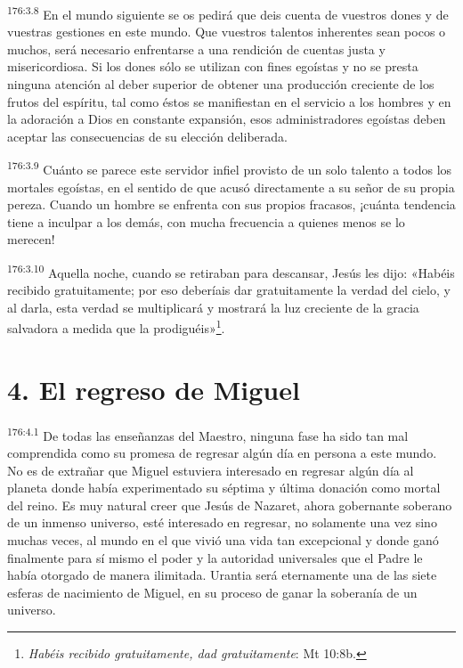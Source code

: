 \par 
\textsuperscript{176:3.8} En el mundo siguiente se os pedirá que deis cuenta de vuestros dones y de vuestras gestiones en este mundo. Que vuestros talentos inherentes sean pocos o muchos, será necesario enfrentarse a una rendición de cuentas justa y misericordiosa. Si los dones sólo se utilizan con fines egoístas y no se presta ninguna atención al deber superior de obtener una producción creciente de los frutos del espíritu, tal como éstos se manifiestan en el servicio a los hombres y en la adoración a Dios en constante expansión, esos administradores egoístas deben aceptar las consecuencias de su elección deliberada.

\par 
\textsuperscript{176:3.9} Cuánto se parece este servidor infiel provisto de un solo talento a todos los mortales egoístas, en el sentido de que acusó directamente a su señor de su propia pereza. Cuando un hombre se enfrenta con sus propios fracasos, ¡cuánta tendencia tiene a inculpar a los demás, con mucha frecuencia a quienes menos se lo merecen!

\par 
\textsuperscript{176:3.10} Aquella noche, cuando se retiraban para descansar, Jesús les dijo: «Habéis recibido gratuitamente; por eso deberíais dar gratuitamente la verdad del cielo, y al darla, esta verdad se multiplicará y mostrará la luz creciente de la gracia salvadora a medida que la prodiguéis»\footnote{\textit{Habéis recibido gratuitamente, dad gratuitamente}: Mt 10:8b.}.

\section*{4. El regreso de Miguel}
\par 
\textsuperscript{176:4.1} De todas las enseñanzas del Maestro, ninguna fase ha sido tan mal comprendida como su promesa de regresar algún día en persona a este mundo. No es de extrañar que Miguel estuviera interesado en regresar algún día al planeta donde había experimentado su séptima y última donación como mortal del reino. Es muy natural creer que Jesús de Nazaret, ahora gobernante soberano de un inmenso universo, esté interesado en regresar, no solamente una vez sino muchas veces, al mundo en el que vivió una vida tan excepcional y donde ganó finalmente para sí mismo el poder y la autoridad universales que el Padre le había otorgado de manera ilimitada. Urantia será eternamente una de las siete esferas de nacimiento de Miguel, en su proceso de ganar la soberanía de un universo.

